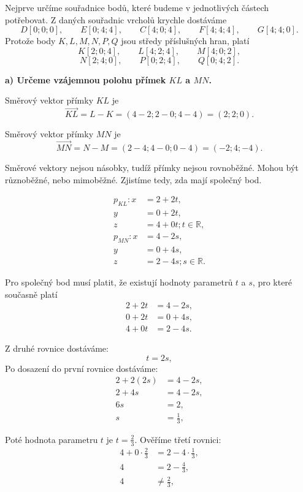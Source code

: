 \begin{example}
    Nejprve určíme souřadnice bodů, které budeme v jednotlivých částech
    potřebovat. Z daných souřadnic vrcholů krychle dostáváme
    \[
        D[0;0;0],\qquad E[0;4;4],\qquad
        C[4;0;4],\qquad F[4;4;4],\qquad G[4;4;0].
    \]
    Protože body $K,L,M,N,P,Q$ jsou středy příslušných hran, platí
    \[
        K[2;0;4],\qquad L[4;2;4],\qquad M[4;0;2],
    \]
    \[
        N[2;4;0],\qquad P[0;2;4],\qquad Q[0;4;2].
    \]

    \textbf{a) Určeme vzájemnou polohu přímek $KL$ a $MN$.}

    Směrový vektor přímky $KL$ je
    \[
        \overrightarrow{KL}
        =L-K
        =(4-2;2-0;4-4)
        =(2;2;0).
    \]

    Směrový vektor přímky $MN$ je
    \[
        \overrightarrow{MN}
        =N-M
        =(2-4;4-0;0-4)
        =(-2;4;-4).
    \]

    Směrové vektory nejsou násobky, tudíž přímky nejsou rovnoběžné.
    Mohou být různoběžné, nebo mimoběžné. Zjistíme tedy, zda mají společný bod.

    \begin{align*}
        p_{KL}: x&=2+2t,\\
                y&=0+2t,\\
                z&=4+0t; t\in\mathbb{R},\\
        p_{MN}: x&=4-2s,\\
                y&=0+4s,\\
                z&=2-4s; s\in\mathbb{R}.
    \end{align*}

    Pro společný bod musí platit, že existují hodnoty parametrů $t$ a $s$, pro které současně platí
    \begin{align*}
        2+2t&=4-2s,\\
        0+2t&=0+4s,\\
        4+0t&=2-4s.
    \end{align*}

    Z druhé rovnice dostáváme:
    \[
    t=2s,
    \]
    Po dosazení do první rovnice dostáváme:
    \begin{align*}
        2+2(2s)&=4-2s,\\
        2+4s&=4-2s,\\
        6s&=2,\\
        s&=\frac13,
    \end{align*}

    Poté hodnota parametru $t$ je $t=\frac{2}{3}$. Ověříme třetí rovnici:
    \begin{align*}
        4+0\cdot\frac{2}{3}&=2-4\cdot\frac{1}{3},\\
        4&=2-\frac{4}{3},\\
        4&\neq\frac{2}{3},
    \end{align*}


\end{example}
